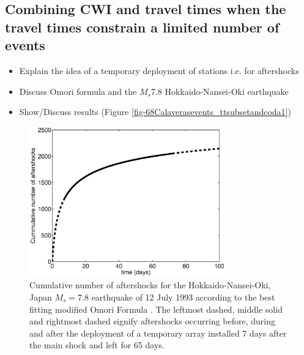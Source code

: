 \documentclass[extra]{gji}
\begin{document}
\subsection{Combining CWI and travel times when the travel times constrain a limited number of events}

\begin{itemize}
\item Explain the idea of a temporary deployment of stations i.e. for aftershocks
\item Discuss Omori formula and the $M_s$7.8 Hokkaido-Nansei-Oki earthquake
\citep[Figure \ref{fig:Omorifigure},]{dr_Utsu95a}
\item Show/Discuss results (Figure \ref{fig-68Calaverasevents_ttsubsetandcoda1})
\end{itemize}

\begin{figure}
\noindent\includegraphics[width = 20pc]{diags/OmoriFigure.eps}
\caption{Cumulative number of aftershocks for the Hokkaido-Nansei-Oki, Japan
$M_s=7.8$ earthquake of 12 July 1993 according to the best fitting modified Omori Formula
\citep{dr_Utsu95a}. The leftmost dashed, middle solid and rightmost dashed signify aftershocks occurring before, during and
after the deployment of a temporary array installed 7 days after the main shock and left for
65 days.}
\label{fig:Omorifigure}
\end{figure}
\end{document}
